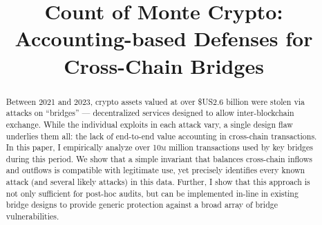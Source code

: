 \documentclass[conference,compsoc]{IEEEtran}
\newcommand{\mil}{\textsc{m}\xspace}
\begin{document}
\title{Count of Monte Crypto: Accounting-based Defenses for Cross-Chain Bridges} %





\iffalse
\newcommand{\alex}[1]{\textcolor{red}{\noindent[AL: #1]}}
\newcommand{\elisa}[1]{\textcolor{blue}{\noindent[EL: #1]}}
\newcommand{\geoff}[1]{\textcolor{teal}{[GV: #1]}}
\newcommand{\deian}[1]{\textcolor{green}{[ds: #1]}}
\else
\newcommand{\alex}[1]{}
\newcommand{\elisa}[1]{}
\newcommand{\geoff}[1]{}
\newcommand{\deian}[1]{}
\fi

\maketitle

\begin{abstract}
Between 2021 and 2023, crypto assets valued at over \$US2.6 billion
were stolen via attacks on ``bridges'' --- decentralized services
designed to allow inter-blockchain exchange.  While the individual
exploits in each attack vary, a single design flaw underlies them all:
the lack of end-to-end value accounting in cross-chain transactions.
In this paper, I empirically analyze over 10\mil million transactions used
by key bridges during this period.  We show that a simple invariant
that balances cross-chain inflows and outflows is compatible with
legitimate use, yet precisely identifies every known attack (and
several likely attacks) in this data.  Further, I show that this
approach is not only sufficient for post-hoc audits, but can be
implemented in-line in existing bridge designs to provide generic
protection against a broad array of bridge vulnerabilities.
\end{abstract}



% 



%














%





% 

% 

% 

% 
% 



% 


\newpage


\clearpage

\end{document}

